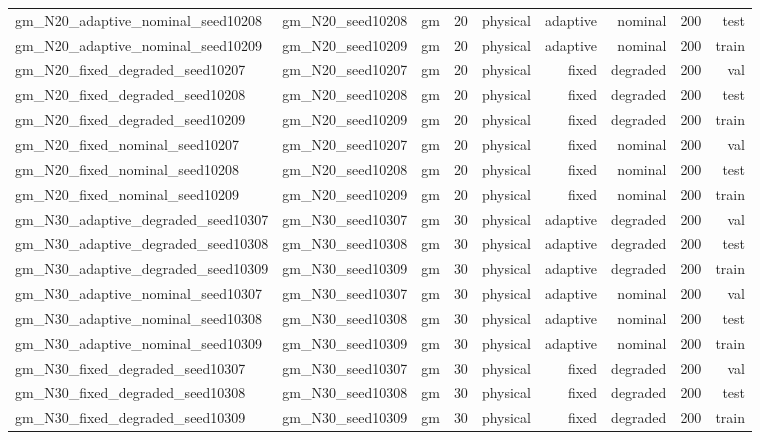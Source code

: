 \begin{tabular}{lrrrrrrrr}
gm\_N20\_adaptive\_nominal\_seed10208 & gm\_N20\_seed10208 & gm & 20 & physical & adaptive & nominal & 200 & test \\
gm\_N20\_adaptive\_nominal\_seed10209 & gm\_N20\_seed10209 & gm & 20 & physical & adaptive & nominal & 200 & train \\
gm\_N20\_fixed\_degraded\_seed10207 & gm\_N20\_seed10207 & gm & 20 & physical & fixed & degraded & 200 & val \\
gm\_N20\_fixed\_degraded\_seed10208 & gm\_N20\_seed10208 & gm & 20 & physical & fixed & degraded & 200 & test \\
gm\_N20\_fixed\_degraded\_seed10209 & gm\_N20\_seed10209 & gm & 20 & physical & fixed & degraded & 200 & train \\
gm\_N20\_fixed\_nominal\_seed10207 & gm\_N20\_seed10207 & gm & 20 & physical & fixed & nominal & 200 & val \\
gm\_N20\_fixed\_nominal\_seed10208 & gm\_N20\_seed10208 & gm & 20 & physical & fixed & nominal & 200 & test \\
gm\_N20\_fixed\_nominal\_seed10209 & gm\_N20\_seed10209 & gm & 20 & physical & fixed & nominal & 200 & train \\
gm\_N30\_adaptive\_degraded\_seed10307 & gm\_N30\_seed10307 & gm & 30 & physical & adaptive & degraded & 200 & val \\
gm\_N30\_adaptive\_degraded\_seed10308 & gm\_N30\_seed10308 & gm & 30 & physical & adaptive & degraded & 200 & test \\
gm\_N30\_adaptive\_degraded\_seed10309 & gm\_N30\_seed10309 & gm & 30 & physical & adaptive & degraded & 200 & train \\
gm\_N30\_adaptive\_nominal\_seed10307 & gm\_N30\_seed10307 & gm & 30 & physical & adaptive & nominal & 200 & val \\
gm\_N30\_adaptive\_nominal\_seed10308 & gm\_N30\_seed10308 & gm & 30 & physical & adaptive & nominal & 200 & test \\
gm\_N30\_adaptive\_nominal\_seed10309 & gm\_N30\_seed10309 & gm & 30 & physical & adaptive & nominal & 200 & train \\
gm\_N30\_fixed\_degraded\_seed10307 & gm\_N30\_seed10307 & gm & 30 & physical & fixed & degraded & 200 & val \\
gm\_N30\_fixed\_degraded\_seed10308 & gm\_N30\_seed10308 & gm & 30 & physical & fixed & degraded & 200 & test \\
gm\_N30\_fixed\_degraded\_seed10309 & gm\_N30\_seed10309 & gm & 30 & physical & fixed & degraded & 200 & train \\

\end{tabular}
